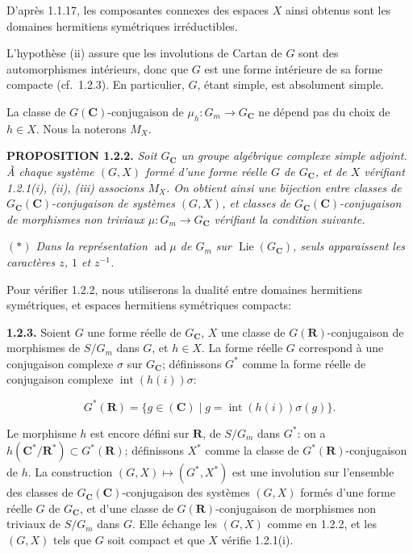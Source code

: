 \documentclass[10pt,a4paper]{article}
\begin{document}
D'après 1.1.17, les composantes connexes des espaces \(X\) ainsi obtenus sont les domaines hermitiens symétriques irréductibles.

L'hypothèse (ii) assure que les involutions de Cartan de \(G\) sont des automorphismes intérieurs, donc que \(G\) est une forme intérieure de sa forme compacte (cf.~1.2.3). En particulier, \(G\), étant simple, est absolument simple.

La classe de \(G(\mathbf C)\)-conjugaison de \(\mu_h:G_m\to G_{\mathbf C}\) ne dépend pas du choix de \(h\in X\). Nous la noterons \(M_X\).

\textbf{PROPOSITION 1.2.2.} \emph{Soit \(G_{\mathbf C}\) un groupe algébrique complexe simple adjoint. À chaque système \((G,X)\) formé d'une forme réelle \(G\) de \(G_{\mathbf C}\), et de \(X\) vérifiant 1.2.1(i), (ii), (iii) associons \(M_X\). On obtient ainsi une bijection entre classes de \(G_{\mathbf C}(\mathbf C)\)-conjugaison de systèmes \((G,X)\), et classes de \(G_{\mathbf C}(\mathbf C)\)-conjugaison de morphismes non triviaux \(\mu:G_m\to G_{\mathbf C}\) vérifiant la condition suivante.}

\emph{\((*)\) Dans la représentation \(\operatorname{ad}\mu\) de \(G_m\) sur \(\operatorname{Lie}(G_{\mathbf C})\), seuls apparaissent les caractères \(z\), \(1\) et \(z^{-1}\).}

Pour vérifier 1.2.2, nous utiliserons la dualité entre domaines hermitiens symétriques, et espaces hermitiens symétriques compacts:

\textbf{1.2.3.} Soient \(G\) une forme réelle de \(G_{\mathbf C}\), \(X\) une classe de \(G(\mathbf R)\)-conjugaison de morphismes de \(S/G_m\) dans \(G\), et \(h\in X\). La forme réelle \(G\) correspond à une conjugaison complexe \(\sigma\) sur \(G_{\mathbf C}\); définissons \(G^*\) comme la forme réelle de conjugaison complexe \(\operatorname{int}(h(i))\sigma\):

\[
G^*(\mathbf R)=\{g\in(\mathbf C)\mid g=\operatorname{int}(h(i))\sigma(g)\}.
\]

Le morphisme \(h\) est encore défini sur \(\mathbf R\), de \(S/G_m\) dans \(G^*\): on a \(h(\mathbf C^*/\mathbf R^*)\subset G^*(\mathbf R)\); définissons \(X^*\) comme la classe de \(G^*(\mathbf R)\)-conjugaison de \(h\). La construction \((G,X)\mapsto(G^*,X^*)\) est une involution sur l'ensemble des classes de \(G_{\mathbf C}(\mathbf C)\)-conjugaison des systèmes \((G,X)\) formés d'une forme réelle \(G\) de \(G_{\mathbf C}\), et d'une classe de \(G(\mathbf R)\)-conjugaison de morphismes non triviaux de \(S/G_m\) dans \(G\). Elle échange les \((G,X)\) comme en 1.2.2, et les \((G,X)\) tels que \(G\) soit compact et que \(X\) vérifie 1.2.1(i).
\end{document}
